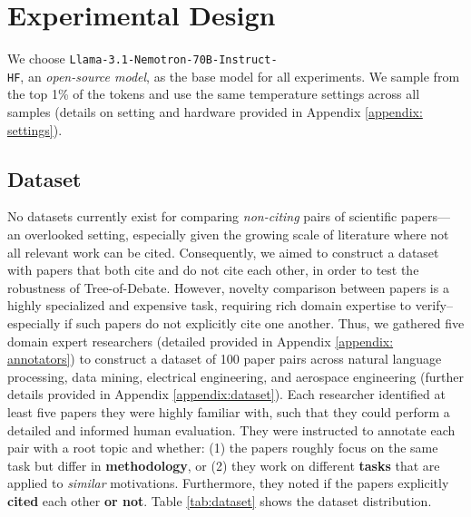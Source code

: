 \section{Experimental Design}
\par We choose \texttt{Llama-3.1-Nemotron-70B-Instruct-\\HF}, an \textit{open-source model}, as the base model for all experiments. We sample from the top 1\% of the tokens and use the same temperature settings across all samples (details on setting and hardware provided in Appendix \ref{appendix: settings}).

\subsection{Dataset}
\label{sec:dataset}
\par No datasets currently exist for comparing \textit{non-citing} pairs of scientific papers--- an overlooked setting, especially given the growing scale of literature where not all relevant work can be cited. Consequently, we aimed to construct a dataset with papers that both cite and do not cite each other, in order to test the robustness of Tree-of-Debate. However, novelty comparison between papers is a highly specialized and expensive task, requiring rich domain expertise to verify-- especially if such papers do not explicitly cite one another. Thus, we gathered five domain expert researchers (detailed provided in Appendix \ref{appendix: annotators}) to construct a dataset of 100 paper pairs across natural language processing, data mining, electrical engineering, and aerospace engineering (further details provided in Appendix \ref{appendix:dataset}). Each researcher identified at least five papers they were highly familiar with, such that they could perform a detailed and informed human evaluation. They were instructed to annotate each pair with a root topic and whether: (1) the papers roughly focus on the same task but differ in \textbf{methodology}, or (2) they work on different \textbf{tasks} that are applied to \textit{similar} motivations. Furthermore, they noted if the papers explicitly \textbf{cited} each other \textbf{or not}. Table \ref{tab:dataset}  shows the dataset distribution.


